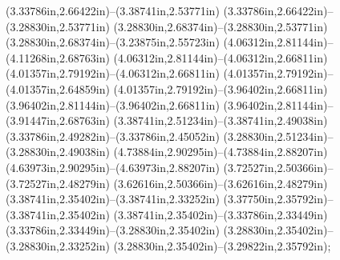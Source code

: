 (3.33786in,2.66422in)--(3.38741in,2.53771in) (3.33786in,2.66422in)--(3.28830in,2.53771in) (3.28830in,2.68374in)--(3.28830in,2.53771in) (3.28830in,2.68374in)--(3.23875in,2.55723in) (4.06312in,2.81144in)--(4.11268in,2.68763in) (4.06312in,2.81144in)--(4.06312in,2.66811in) (4.01357in,2.79192in)--(4.06312in,2.66811in) (4.01357in,2.79192in)--(4.01357in,2.64859in) (4.01357in,2.79192in)--(3.96402in,2.66811in) (3.96402in,2.81144in)--(3.96402in,2.66811in) (3.96402in,2.81144in)--(3.91447in,2.68763in) (3.38741in,2.51234in)--(3.38741in,2.49038in) (3.33786in,2.49282in)--(3.33786in,2.45052in) (3.28830in,2.51234in)--(3.28830in,2.49038in) (4.73884in,2.90295in)--(4.73884in,2.88207in) (4.63973in,2.90295in)--(4.63973in,2.88207in) (3.72527in,2.50366in)--(3.72527in,2.48279in) (3.62616in,2.50366in)--(3.62616in,2.48279in) (3.38741in,2.35402in)--(3.38741in,2.33252in) (3.37750in,2.35792in)--(3.38741in,2.35402in) (3.38741in,2.35402in)--(3.33786in,2.33449in) (3.33786in,2.33449in)--(3.28830in,2.35402in) (3.28830in,2.35402in)--(3.28830in,2.33252in) (3.28830in,2.35402in)--(3.29822in,2.35792in);
